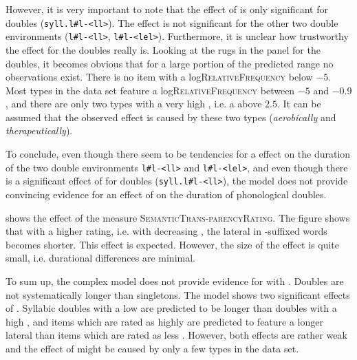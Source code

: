 However, it is very important to note that the effect of  is only significant for  doubles (\texttt{syll.l\#l-<ll>}).  The effect is not significant for the other two double environments (\texttt{l\#l-<ll>}, \texttt{l\#l-<lel>}). 
Furthermore, it is unclear how trustworthy the effect for the  doubles really is. Looking at the rugs in the panel for the  doubles, it becomes obvious that for a large portion of the predicted  range no observations exist. There is no item with a log\textsc{RelativeFrequency} below $-5$. 
Most types in the data set feature a log\textsc{RelativeFrequency} between $-5$ and $-0.9$, and there are only two types with a very high , i.e. a   above $2.5$. It can be assumed that the observed  effect is caused by these two types (\textit{aerobically} and \textit{therapeutically}). 


To conclude, even though there seem to be tendencies for a  effect on the duration of the two double environments  \texttt{l\#l-<ll>} and \texttt{l\#l-<lel>}, and even though there is a significant effect of  for  doubles  (\texttt{syll.l\#l-<ll>}), the model does not provide convincing evidence for an effect of  on the duration of phonological doubles.







 shows the effect of the  measure \textsc{SemanticTrans-parencyRating}. The figure shows that with a higher rating, i.e. with decreasing , the lateral in -suffixed words becomes shorter. This effect is expected. However, the size of the effect is quite small, i.e. durational differences are minimal.





To sum up, the complex model does not provide evidence for  with . Doubles are not systematically longer than singletons. 
The model shows two significant effects of . Syllabic doubles with a low  are predicted to be longer than  doubles with a high , and items which are rated as highly  are predicted to feature a longer lateral than items which are rated as less . However, both effects are rather weak and the effect of  might be caused by only a few types in the data set.



